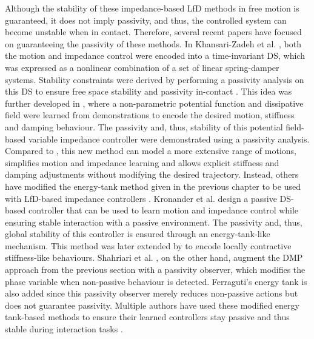 Although the stability of these impedance-based LfD methods in free motion is guaranteed, it does not imply passivity, and thus, the controlled system can become unstable when in contact. Therefore, several recent papers have focused on guaranteeing the passivity of these methods. In Khansari-Zadeh et al. \cite{khansari-zadehModelingRobotDiscrete2014}, both the motion and impedance control were encoded into a time-invariant DS, which was expressed as a nonlinear combination of a set of linear spring-damper systems. Stability constraints were derived by performing a passivity analysis on this DS to ensure free space stability and passivity in-contact \cite{khansariModelingRobotDiscrete2014}. This idea was further developed in \cite{khansari-zadehLearningPotentialFunctions2017}, where a non-parametric potential function and dissipative field were learned from demonstrations to encode the desired motion, stiffness and damping behaviour. The passivity and, thus, stability of this potential field-based variable impedance controller were demonstrated using a passivity analysis. Compared to \cite{khansariModelingRobotDiscrete2014}, this new method can model a more extensive range of motions, simplifies motion and impedance learning and allows explicit stiffness and damping adjustments without modifying the desired trajectory. Instead, others have modified the energy-tank method given in the previous chapter to be used with LfD-based impedance controllers \cite{kronanderPassiveInteractionControl2016,shahriariAdaptingContactsEnergy2017}. Kronander et al. \cite{kronanderPassiveInteractionControl2016} design a passive DS-based controller that can be used to learn motion and impedance control while ensuring stable interaction with a passive environment. The passivity and, thus, global stability of this controller is ensured through an energy-tank-like mechanism. This method was later extended by \cite{figueroaLocallyActiveGlobally2022,chenClosedLoopVariableStiffness2021} to encode locally contractive stiffness-like behaviours. Shahriari et al. \cite{shahriariAdaptingContactsEnergy2017}, on the other hand, augment the DMP approach from the previous section with a passivity observer, which modifies the phase variable when non-passive behaviour is detected. Ferraguti's energy tank is also added since this passivity observer merely reduces non-passive actions but does not guarantee passivity. Multiple authors have used these modified energy tank-based methods to ensure their learned controllers stay passive and thus stable during interaction tasks \cite{kastritsiPHRIFrameworkModifying2018,kastritsiProgressiveAutomationDMP2018,dimeasProgressiveAutomationPeriodic2020,papageorgiouKinestheticGuidanceUtilizing2020,krambergerPassivityBasedIterative2018,amanhoudDynamicalSystemApproach2019,enayatiVariableImpedanceForceControl2020,michelBilateralTeleoperationAdaptive2021,wuFrameworkAutonomousImpedance2021,wuLearningDemonstrationInteractive2022,zhaoHybridLearningOptimization2022}.

